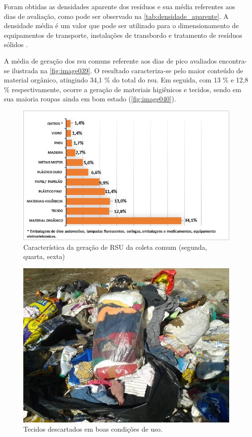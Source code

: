 


Foram obtidas as densidades aparente dos resíduos e sua média referentes aos dias de avaliação, como pode ser observado na \autoref{tab:densidade_aparente}. A densidade média é um valor que pode ser utilizado para o dimensionamento de equipamentos de transporte, instalações de transbordo e tratamento de resíduos sólidos \cite{ibam:2001}.



A média de geração dos \gls{rsu} comuns referente aos dias de pico avaliados encontra-se ilustrada na \autoref{fig:image039}. O resultado caracteriza-se pelo maior conteúdo de material orgânico, atingindo 34,1 \% do total do \gls{rsu}. Em seguida, com 13 \% e 12,8 \% respectivamente, ocorre a geração de materiais higiênicos e tecidos, sendo em sua maioria roupas ainda em bom estado (\autoref{fig:image040}). 

\begin{figure}
	\centering
	\includegraphics[width=1\linewidth]{produtos/prodtres/image039}
	\caption{Característica da geração de RSU da coleta comum (segunda, quarta, sexta)}
	\label{fig:image039}
\end{figure}


\begin{figure}
	\centering
	\includegraphics[width=0.7\linewidth]{produtos/prodtres/image040}
	\caption{Tecidos descartados em boas condições de uso.}
	\label{fig:image040}
\end{figure}

